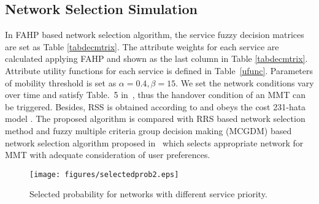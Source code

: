 \documentclass[conference]{IEEEtran}
\begin{document}
\subsection{Network Selection Simulation}


In FAHP based network selection algorithm, the service fuzzy decision matrices are set as Table \ref{tabdecmtrix}. 
The attribute weights for each service are calculated applying FAHP and shown as the last column in Table \ref{tabdecmtrix}.
Attribute utility functions for each service is defined in Table~\ref{ufunc}.
Parameters of mobility threshold is set as $\alpha = 0.4,\beta = 15$.
We set the network conditions vary over time and satisfy Table.~5 in~\cite{select}, thus the handover condition of an MMT can be triggered. Besides, RSS is obtained according to \cite{RSSList} and obeys the cost 231-hata model \cite{Tsinghua}.
 The proposed algorithm is compared with RRS based network selection method and fuzzy multiple criteria group decision making (MCGDM) based network selection algorithm proposed in~\cite{MCGDM} which selects appropriate network for MMT with adequate consideration of user preferences. 



\begin{figure}[htbp!]
	\centering
	\texttt{[image: figures/selectedprob2.eps]}
	\caption{Selected probability for networks with different service priority.}\label{fig:selectedprob}
	\vspace{-1em}
\end{figure}
\end{document}
